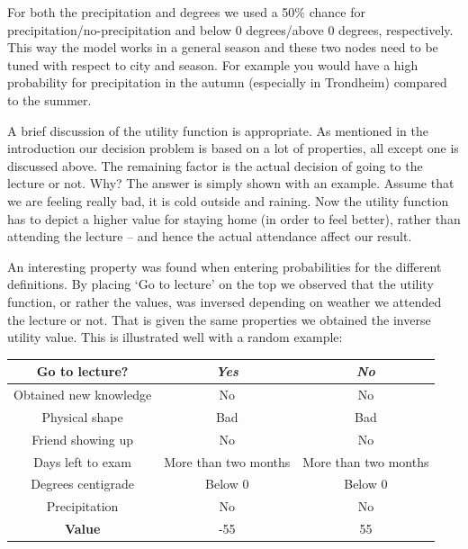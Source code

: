 \documentclass{article}
\begin{document}
For both the precipitation and degrees we used a 50\% chance for
precipitation/no-precipitation and below 0 degrees/above 0 degrees,
respectively. This way the model works in a general season and these two nodes
need to be tuned with respect to city and season.  For example you would have a
high probability for precipitation in the autumn (especially in Trondheim)
compared to the summer.

A brief discussion of the utility function is appropriate. As mentioned in the
introduction our decision problem is based on a lot of properties, all except
one is discussed above. The remaining factor is the actual decision of going to
the lecture or not.  Why? The answer is simply shown with an example. Assume
that we are feeling really bad, it is cold outside and raining.  Now the
utility function has to depict a higher value for staying home (in order to
feel better), rather than attending the lecture -- and hence the actual
attendance affect our result. 

An interesting property was found when entering probabilities for the different
definitions. By placing ‘Go to lecture’ on the top we observed that the utility
function, or rather the values, was inversed depending on weather we attended
the lecture or not.  That is given the same properties we obtained the inverse
utility value. This is illustrated well with a random example:

\begin{table}[h]
  \centering
  \begin{tabular}{|c|c|c|} \hline
    Go to lecture? & \emph{Yes} & \emph{No} \\ \hline
    Obtained new knowledge & No & No \\ \hline
    Physical shape & Bad & Bad \\ \hline
    Friend showing up & No & No \\ \hline
    Days left to exam & More than two months & More than two months \\ \hline
    Degrees centigrade & Below 0 & Below 0 \\ \hline
    Precipitation & No & No \\ \hline
    {\bf Value } & -55 & 55 \\ \hline
  \end{tabular}
\end{table}
\end{document}
